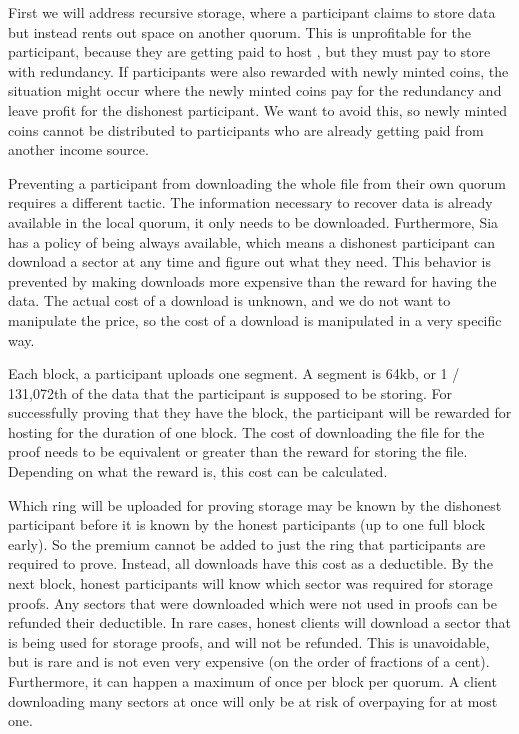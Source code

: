 \documentclass[twocolumn]{article}
\begin{document}
First we will address recursive storage, where a participant claims to store data but instead rents out space on another quorum.
This is unprofitable for the participant, because they are getting paid to host \participantvolume{}, but they must pay to store \participantvolume{} with redundancy.
If participants were also rewarded with newly minted coins, the situation might occur where the newly minted coins pay for the redundancy and leave profit for the dishonest participant.
We want to avoid this, so newly minted coins cannot be distributed to participants who are already getting paid from another income source.

Preventing a participant from downloading the whole file from their own quorum requires a different tactic.
The information necessary to recover data is already available in the local quorum, it only needs to be downloaded.
Furthermore, Sia has a policy of being always available, which means a dishonest participant can download a sector at any time and figure out what they need.
This behavior is prevented by making downloads more expensive than the reward for having the data.
The actual cost of a download is unknown, and we do not want to manipulate the price, so the cost of a download is manipulated in a very specific way.

Each block, a participant uploads one segment.
A segment is 64kb, or 1 / 131,072th of the data that the participant is supposed to be storing.
For successfully proving that they have the block, the participant will be rewarded for hosting \participantvolume{} for the duration of one block.
The cost of downloading the file for the proof needs to be equivalent or greater than the reward for storing the file.
Depending on what the reward is, this cost can be calculated.

Which ring will be uploaded for proving storage may be known by the dishonest participant before it is known by the honest participants (up to one full block early).
So the premium cannot be added to just the ring that participants are required to prove.
Instead, all downloads have this cost as a deductible.
By the next block, honest participants will know which sector was required for storage proofs.
Any sectors that were downloaded which were not used in proofs can be refunded their deductible.
In rare cases, honest clients will download a sector that is being used for storage proofs, and will not be refunded.
This is unavoidable, but is rare and is not even very expensive (on the order of fractions of a cent).
Furthermore, it can happen a maximum of once per block per quorum.
A client downloading many sectors at once will only be at risk of overpaying for at most one.
\end{document}

